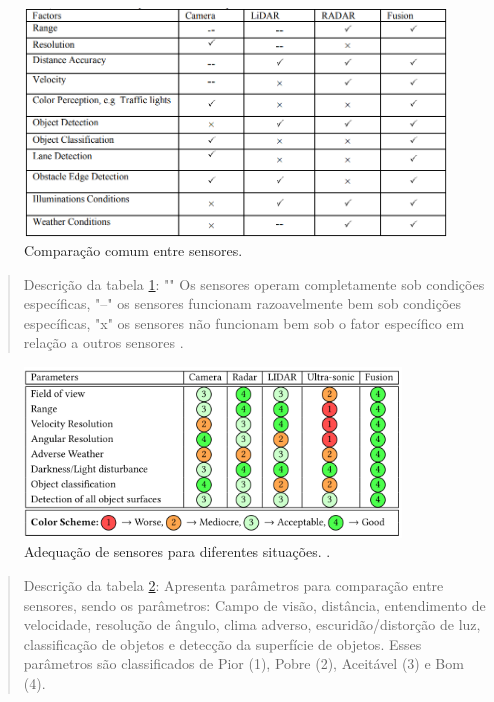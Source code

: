 \begin{figure}[H]
\centering
\includegraphics[width=12cm]{Figures/juncao-table.png}
\caption{Comparação comum entre sensores.}
\label{tabela-juncao}
\end{figure}
\begin{quote}
Descrição da tabela \ref{tabela-juncao}: "\checkmark" Os sensores operam completamente sob condições específicas,
"--" os sensores funcionam razoavelmente bem sob condições específicas, "x" os sensores não funcionam bem sob o fator específico em relação a outros sensores \cite{sensors}.
\end{quote}
\begin{figure}[H]
\centering
\includegraphics[width=10cm]{Figures/all-sense.png}
\caption{Adequação de sensores para diferentes situações. \cite{sensors-yet}.}
\label{all-sense}
\end{figure}
\begin{quote}
Descrição da tabela \ref{all-sense}: Apresenta parâmetros para comparação entre sensores, sendo os parâmetros: Campo de visão, distância, entendimento de velocidade, resolução de ângulo, clima adverso, escuridão/distorção de luz, classificação de objetos e detecção da superfície de objetos. Esses parâmetros são classificados de Pior (1), Pobre (2), Aceitável (3) e Bom (4).
\end{quote}

